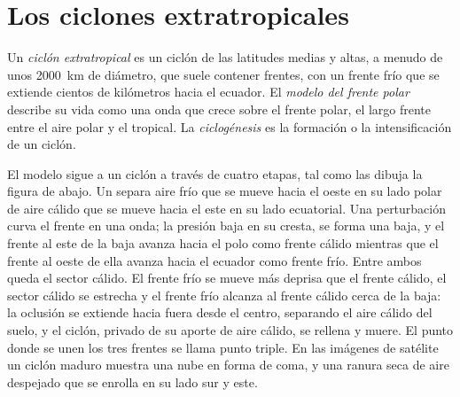 \section{Los ciclones extratropicales}\label{sec:b2:weather-systems:cyclones}

\begin{definition}\label{def:b2:weather-systems:cyclones}
Un \emph{ciclón extratropical} es un ciclón de las latitudes medias y
altas, a menudo de unos \qty{2000}{km} de diámetro, que suele contener frentes, con un frente frío que se extiende
cientos de kilómetros hacia el ecuador. El \emph{modelo del frente polar}
describe su vida como una onda que crece sobre el frente polar, el largo frente entre el aire polar
y el tropical. La \emph{ciclogénesis} es la formación o la intensificación
de un ciclón.
\end{definition}

El modelo sigue a un ciclón a través de cuatro etapas, tal como las dibuja la figura de abajo. Un  separa aire frío que se mueve hacia el oeste en su lado polar de aire cálido que se mueve hacia el este en su
lado ecuatorial. Una perturbación curva el frente en una onda; la presión baja en su cresta, se
forma una baja, y el frente al este de la baja avanza hacia el polo como frente cálido mientras que el frente al oeste
de ella avanza hacia el ecuador como frente frío. Entre ambos queda el sector cálido. El frente frío
se mueve más deprisa que el frente cálido, el sector cálido se estrecha y el frente frío alcanza al frente
cálido cerca de la baja: la oclusión se extiende hacia fuera desde el centro, separando el aire cálido del
suelo, y el ciclón, privado de su aporte de aire cálido, se rellena y muere. El punto donde se
unen los tres frentes se llama punto triple. En las imágenes de satélite un ciclón maduro muestra una
nube en forma de coma, y una ranura seca de aire despejado que se enrolla en su lado sur y este.

